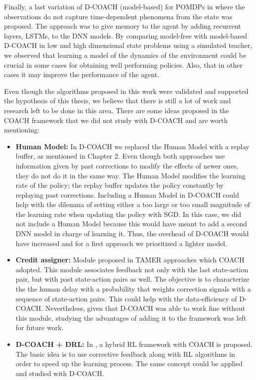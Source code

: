 \begin{conclusion}
Finally, a last variation of D-COACH (model-based) for POMDPs in where the observations do not capture time-dependent phenomena from the state was proposed. The approach was to give memory to the agent by adding recurrent layers, LSTMs, to the DNN models. By comparing model-free with model-based D-COACH in low and high dimensional state problems using a simulated teacher, we observed that learning a model of the dynamics of the environment could be crucial in some cases for obtaining well performing policies. Also, that in other cases it may improve the performance of the agent. 

Even though the algorithms proposed in this work were validated and supported the hypothesis of this thesis, we believe that there is still a lot of work and research left to be done in this area. There are some ideas proposed in the COACH framework that we did not study with D-COACH and are worth mentioning:

\begin{itemize}
    \item \textbf{Human Model:} In D-COACH we replaced the Human Model with a replay buffer, as mentioned in Chapter 2. Even though both approaches use information given by past corrections to modify the effects of newer ones, they do not do it in the same way. The Human Model modifies the learning rate of the policy; the replay buffer updates the policy constantly by replaying past corrections. Including a Human Model in D-COACH could help with the dilemma of setting either a too large or too small magnitude of the learning rate when updating the policy with SGD. In this case, we did not include a Human Model because this would have meant to add a second DNN model in charge of learning it. Thus, the overhead of D-COACH would have increased and for a first approach we prioritized a lighter model.
    \item \textbf{Credit assigner:} Module proposed in TAMER approaches \cite{Knox:2009:ISA:1597735.1597738} which COACH adopted. This module associates feedback not only with the last state-action pair, but with past state-action pairs as well. The objective is to characterize the the human delay with a probability that weights correction signals with a sequence of state-action pairs. This could help with the data-efficiency of D-COACH. Nevertheless, given that D-COACH was able to work fine without this module, studying the advantages of adding it to the framework was left for future work. 
    \item \textbf{D-COACH + DRL:} In \cite{celemin2018fast}, a hybrid RL framework with COACH is proposed. The basic idea is to use corrective feedback along with RL algorithms in order to speed up the learning process. The same concept could be applied and studied with D-COACH. 
\end{itemize}


\end{conclusion}
